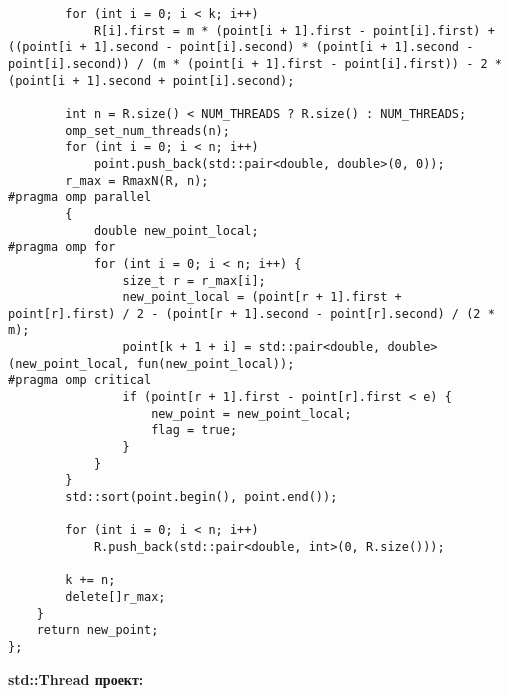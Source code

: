 \documentclass{report}
\begin{document}
\begin{lstlisting}
        for (int i = 0; i < k; i++)
            R[i].first = m * (point[i + 1].first - point[i].first) + ((point[i + 1].second - point[i].second) * (point[i + 1].second - point[i].second)) / (m * (point[i + 1].first - point[i].first)) - 2 * (point[i + 1].second + point[i].second);

        int n = R.size() < NUM_THREADS ? R.size() : NUM_THREADS;
        omp_set_num_threads(n);
        for (int i = 0; i < n; i++)
            point.push_back(std::pair<double, double>(0, 0));
        r_max = RmaxN(R, n);
#pragma omp parallel
        {
            double new_point_local;
#pragma omp for
            for (int i = 0; i < n; i++) {
                size_t r = r_max[i];
                new_point_local = (point[r + 1].first + point[r].first) / 2 - (point[r + 1].second - point[r].second) / (2 * m);
                point[k + 1 + i] = std::pair<double, double>(new_point_local, fun(new_point_local));
#pragma omp critical
                if (point[r + 1].first - point[r].first < e) {
                    new_point = new_point_local;
                    flag = true;
                }
            }
        }
        std::sort(point.begin(), point.end());

        for (int i = 0; i < n; i++)
            R.push_back(std::pair<double, int>(0, R.size()));

        k += n;
        delete[]r_max;
    }
    return new_point;
};
\end{lstlisting}

\textbf{std::Thread проект:}
\end{document}
